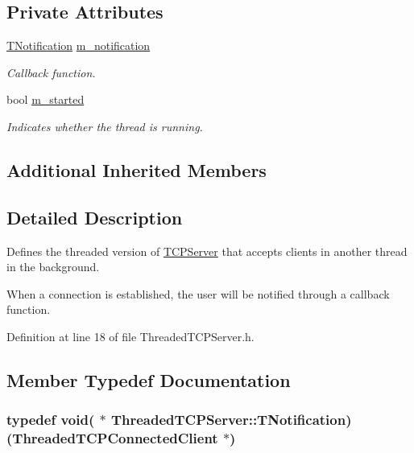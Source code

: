 \subsection*{Private Attributes}
\begin{DoxyCompactItemize}
\item 
\hyperlink{class_threaded_t_c_p_server_a01f9e29f617f3452bbf1cdc33acdf905}{T\-Notification} \hyperlink{class_threaded_t_c_p_server_acb1fa272e38dbd62673d5279a3e94345}{m\-\_\-notification}
\begin{DoxyCompactList}\small\item\em Callback function. \end{DoxyCompactList}\item 
bool \hyperlink{class_threaded_t_c_p_server_aae68c31d87e830f67907edba35eceec3}{m\-\_\-started}
\begin{DoxyCompactList}\small\item\em Indicates whether the thread is running. \end{DoxyCompactList}\end{DoxyCompactItemize}
\subsection*{Additional Inherited Members}


\subsection{Detailed Description}
Defines the threaded version of \hyperlink{class_t_c_p_server}{T\-C\-P\-Server} that accepts clients in another thread in the background. 

When a connection is established, the user will be notified through a callback function. 

Definition at line 18 of file Threaded\-T\-C\-P\-Server.\-h.



\subsection{Member Typedef Documentation}
\hypertarget{class_threaded_t_c_p_server_a01f9e29f617f3452bbf1cdc33acdf905}{
\subsubsection[{T\-Notification}]{\setlength{\rightskip}{0pt plus 5cm}typedef void( $\ast$ Threaded\-T\-C\-P\-Server\-::\-T\-Notification)({\bf Threaded\-T\-C\-P\-Connected\-Client} $\ast$)}}\label{class_threaded_t_c_p_server_a01f9e29f617f3452bbf1cdc33acdf905}


